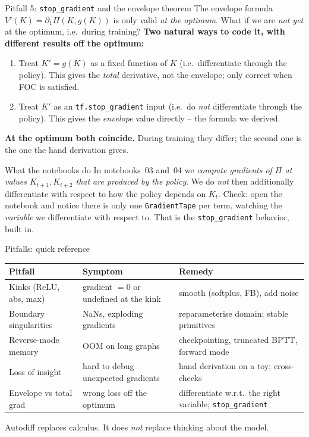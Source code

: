 \documentclass[aspectratio=169,11pt]{beamer}
\newcommand{\emphc}[1]{\textcolor{harvardcrimson}{#1}}
\begin{document}
\begin{frame}[fragile]{Pitfall 5: \texttt{stop\_gradient} and the envelope theorem}
\small The envelope formula $V'(K) = \partial_1 \Pi(K, g(K))$ is only valid \emph{at the optimum}. What if we are \emph{not yet} at the optimum, i.e.\ during training?
\vspace{4pt}
\textbf{Two natural ways to code it, with different results off the optimum:}
\begin{enumerate}\itemsep3pt
\item \emphc{Treat $K' = g(K)$ as a fixed function of $K$} (i.e.\ differentiate through the policy). This gives the \emph{total} derivative, not the envelope; only correct when FOC is satisfied.
\item \emphc{Treat $K'$ as an \texttt{tf.stop\_gradient} input} (i.e.\ do \emph{not} differentiate through the policy). This gives the \emph{envelope} value directly -- the formula we derived.
\end{enumerate}
\vspace{4pt}
\textbf{At the optimum both coincide.} During training they differ; the second one is the one the hand derivation gives.
\begin{exampleblock}{What the notebooks do}
\small In notebooks~03 and~04 we \emph{compute gradients of $\Pi$ at values $K_{t+1}, K_{t+2}$ that are produced by the policy}. We do \emph{not} then additionally differentiate with respect to how the policy depends on $K_t$. Check: open the notebook and notice there is only one \texttt{GradientTape} per term, watching the \emph{variable} we differentiate with respect to. That is the \texttt{stop\_gradient} behavior, built in.
\end{exampleblock}
\end{frame}

\begin{frame}[fragile]{Pitfalls: quick reference}
\footnotesize
\begin{center}
\renewcommand{\arraystretch}{1.2}
\begin{tabular}{p{3.2cm} p{4.4cm} p{4.6cm}}
\toprule
\textbf{Pitfall} & \textbf{Symptom} & \textbf{Remedy} \\
\midrule
Kinks (ReLU, abs, max) & gradient $=0$ or undefined at the kink & smooth (softplus, FB), add noise \\
Boundary singularities & NaNs, exploding gradients & reparameterise domain; stable primitives \\
Reverse-mode memory & OOM on long graphs & checkpointing, truncated BPTT, forward mode \\
Loss of insight & hard to debug unexpected gradients & hand derivation on a toy; cross-checks \\
Envelope vs total grad & wrong loss off the optimum & differentiate w.r.t.\ the right variable; \texttt{stop\_gradient} \\
\bottomrule
\end{tabular}
\end{center}
\vspace{6pt}
\centerline{\emphc{Autodiff replaces calculus. It does \emph{not} replace thinking about the model.}}
\end{frame}
\end{document}
